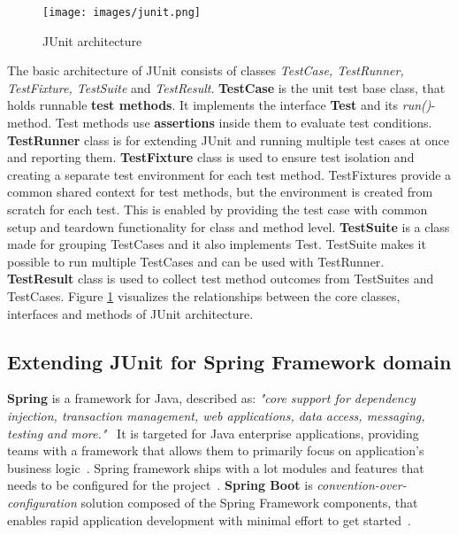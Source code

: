     \begin{figure}[ht]
      \begin{center}
        \texttt{[image: images/junit.png]}
        \caption{JUnit architecture}
        \label{fig:junit}
      \end{center}
    \end{figure}

    The basic architecture of JUnit consists of classes \textit{TestCase, TestRunner, TestFixture, TestSuite} and \textit{TestResult}.
    \textbf{TestCase} is the unit test base class, that holds runnable \textbf{test methods}.
    It implements the interface \textbf{Test} and its \textit{run()}-method. Test methods use \textbf{assertions} inside them to evaluate test conditions.
    \textbf{TestRunner} class is for extending JUnit and running multiple test cases at once and reporting
    them. \textbf{TestFixture} class is used to ensure test isolation and creating a separate test environment for each test method.
    TestFixtures provide a common shared context for test methods, but the environment is created from scratch for each test.
    This is enabled by providing the test case with common setup and teardown functionality for class and method level.
    \textbf{TestSuite} is a class made for grouping TestCases and it also implements Test. TestSuite makes it possible to run multiple TestCases and can
    be used with TestRunner. \textbf{TestResult} class is used to collect test method outcomes from TestSuites and TestCases.
    Figure \ref{fig:junit} visualizes the relationships between the core classes, interfaces and methods of JUnit architecture. ~\cite{hamill2004unit}

    \subsection{Extending JUnit for Spring Framework domain}
    \textbf{Spring} is a framework for Java, described as:
    \textit{"core support for dependency injection, transaction management, web applications, data access, messaging, testing and more."}~\cite{spring}
    It is targeted for Java enterprise applications, providing teams with a framework that allows them to primarily focus on
    application's business logic~\cite{spring}. Spring framework ships with a lot modules and features that needs to be
    configured for the project~\cite{wiki:spring}. \textbf{Spring Boot} is \textit{convention-over-configuration} solution
    composed of the Spring Framework components, that enables rapid application development with minimal effort to get started~\cite{wiki:spring}.

